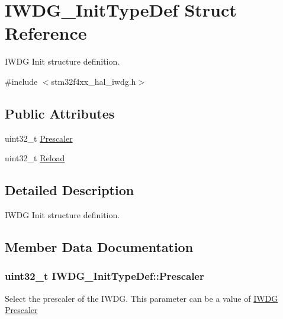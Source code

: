 \hypertarget{struct_i_w_d_g___init_type_def}{}\section{I\+W\+D\+G\+\_\+\+Init\+Type\+Def Struct Reference}
\label{struct_i_w_d_g___init_type_def}


I\+W\+DG Init structure definition.  




{\ttfamily \#include $<$stm32f4xx\+\_\+hal\+\_\+iwdg.\+h$>$}

\subsection*{Public Attributes}
\begin{DoxyCompactItemize}
\item 
uint32\+\_\+t \hyperlink{struct_i_w_d_g___init_type_def_adb8ce67e656492f5ac26473bb70c5daa}{Prescaler}
\item 
uint32\+\_\+t \hyperlink{struct_i_w_d_g___init_type_def_af5a275e4c73292039258a0287fb7901d}{Reload}
\end{DoxyCompactItemize}


\subsection{Detailed Description}
I\+W\+DG Init structure definition. 

\subsection{Member Data Documentation}
\subsubsection[{\texorpdfstring{Prescaler}{Prescaler}}]{\setlength{\rightskip}{0pt plus 5cm}uint32\+\_\+t I\+W\+D\+G\+\_\+\+Init\+Type\+Def\+::\+Prescaler}\hypertarget{struct_i_w_d_g___init_type_def_adb8ce67e656492f5ac26473bb70c5daa}{}\label{struct_i_w_d_g___init_type_def_adb8ce67e656492f5ac26473bb70c5daa}
Select the prescaler of the I\+W\+DG. This parameter can be a value of \hyperlink{group___i_w_d_g___prescaler}{I\+W\+DG Prescaler} 
